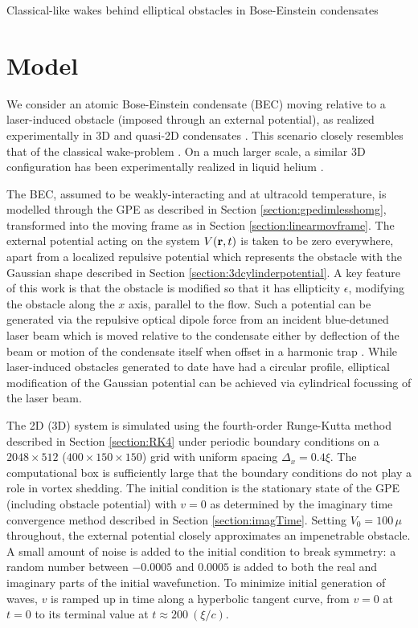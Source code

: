 \begin{chapter}{\label{cha:wake}Classical-like wakes behind elliptical obstacles in Bose-Einstein condensates}
\section{Model}

We consider an atomic Bose-Einstein condensate (BEC) moving relative to a laser-induced obstacle (imposed through 
an external potential), as realized experimentally in 3D \cite{Raman,Onofrio,Inouye,Neely} and quasi-2D condensates \cite{Neely}.  This scenario closely resembles that of the classical wake-problem \cite{taneda41,taneda112}.  On a much larger scale, a similar 
3D configuration has been experimentally realized in liquid helium 
\cite{VanSciver1999,VanSciver2005}.

The BEC, assumed to be weakly-interacting and at ultracold temperature, is modelled through the GPE as described in Section \ref{section:gpedimlesshomg}, transformed into the moving frame as in Section \ref{section:linearmovframe}. The external potential acting on the system $V({\bf r}, t)$ is taken to be zero everywhere, apart from a localized repulsive potential which represents the obstacle with the Gaussian shape described in Section \ref{section:3dcylinderpotential}. A key feature of this work is that the obstacle is modified so that it has ellipticity $\epsilon$, modifying the obstacle along the $x$ axis, parallel to the flow. Such a potential can be generated via the repulsive optical dipole force from an incident blue-detuned laser beam which is moved relative to the condensate either by deflection of the beam \cite{Raman,Onofrio,Inouye} or motion of the condensate itself when offset in a harmonic trap \cite{Neely,kwon_moon_14,kwon_2015a}.  While laser-induced obstacles generated to date have had a circular profile, elliptical modification of the Gaussian potential can be achieved via cylindrical focussing of the laser beam.   

The 2D (3D) system is simulated using the fourth-order Runge-Kutta method described in Section \ref{section:RK4} under periodic boundary conditions on a $2048 \times 512$ ($400 \times 150 \times 150$) grid with uniform spacing $\Delta_x=0.4\xi$. The computational box is sufficiently large that the boundary conditions do not play a role in vortex shedding.  The initial condition is the stationary state of the GPE (including obstacle potential) with $v=0$ as determined by the imaginary time convergence method described in Section \ref{section:imagTime}. Setting $V_0=100\,\mu$ throughout, the external potential closely approximates an impenetrable obstacle. A small amount of noise is added to the initial condition to break symmetry: a random number between $-0.0005$ and $0.0005$ is added to both the real and imaginary parts of the initial wavefunction. To minimize initial generation of waves, $v$ is ramped up in time along a hyperbolic tangent curve, from $v=0$ at $t=0$ to its terminal value at $t\approx200~(\xi/c)$.


\end{chapter}
